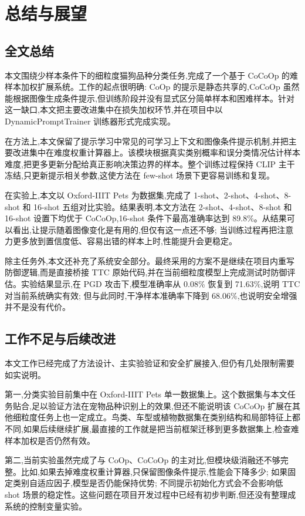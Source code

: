 \chapter{总结与展望}

\section{全文总结}

本文围绕少样本条件下的细粒度猫狗品种分类任务,完成了一个基于 CoCoOp 的难样本加权扩展系统。工作的起点很明确: CoOp 的提示是静态共享的,CoCoOp 虽然能根据图像生成条件提示,但训练阶段并没有显式区分简单样本和困难样本。针对这一缺口,本文把主要改进集中在损失加权环节,并在项目中以 DynamicPromptTrainer 训练器形式完成实现。

在方法上,本文保留了提示学习中常见的可学习上下文和图像条件提示机制,并把主要改进集中在难度权重计算器上。该模块根据真实类别概率和误分类情况估计样本难度,把更多更新分配给真正影响决策边界的样本。整个训练过程保持 CLIP 主干冻结,只更新提示相关参数,这使方法在 few-shot 场景下更容易训练和复现。

在实验上,本文以 Oxford-IIIT Pets 为数据集,完成了 1-shot、2-shot、4-shot、8-shot 和 16-shot 五组对比实验。结果表明,本文方法在 2-shot、4-shot、8-shot 和 16-shot 设置下均优于 CoCoOp,16-shot 条件下最高准确率达到 89.8\%。从结果可以看出,让提示随着图像变化是有用的,但仅有这一点还不够; 当训练过程再把注意力更多放到置信度低、容易出错的样本上时,性能提升会更稳定。

除主任务外,本文还补充了系统安全部分。最终采用的方案不是继续在项目内重写防御逻辑,而是直接桥接 TTC 原始代码,并在当前细粒度模型上完成测试时防御评估。实验结果显示,在 PGD 攻击下,模型准确率从 0.08\% 恢复到 71.63\%,说明 TTC 对当前系统确实有效; 但与此同时,干净样本准确率下降到 68.06\%,也说明安全增强并不是没有代价。

\section{工作不足与后续改进}

本文工作已经完成了方法设计、主实验验证和安全扩展接入,但仍有几处限制需要如实说明。

第一,分类实验目前集中在 Oxford-IIIT Pets 单一数据集上。这个数据集与本文任务贴合,足以验证方法在宠物品种识别上的效果,但还不能说明该 CoCoOp 扩展在其他细粒度任务上也一定成立。鸟类、车型或植物数据集在类别结构和局部特征上都不同,如果后续继续扩展,最直接的工作就是把当前框架迁移到更多数据集上,检查难样本加权是否仍然有效。

第二,当前实验虽然完成了与 CoOp、CoCoOp 的主对比,但模块级消融还不够完整。比如,如果去掉难度权重计算器,只保留图像条件提示,性能会下降多少; 如果固定类别自适应因子,模型是否仍能保持优势; 不同提示初始化方式会不会影响低 shot 场景的稳定性。这些问题在项目开发过程中已经有初步判断,但还没有整理成系统的控制变量实验。

